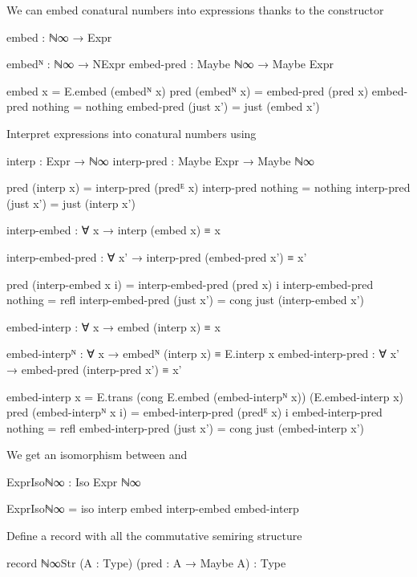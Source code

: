 We can embed conatural numbers into expressions thanks to the
 constructor
\begin{code}
embed : ℕ∞ → Expr
\end{code}
\begin{code}[hide]
embedᴺ : ℕ∞ → NExpr
embed-pred : Maybe ℕ∞ → Maybe Expr

embed x = E.embed (embedᴺ x)
pred (embedᴺ x) = embed-pred (pred x)
embed-pred nothing = nothing
embed-pred (just x') = just (embed x')
\end{code}
Interpret expressions into conatural numbers using 
\begin{code}
interp : Expr → ℕ∞
interp-pred : Maybe Expr → Maybe ℕ∞

pred (interp x) = interp-pred (predᴱ x)
interp-pred nothing = nothing
interp-pred (just x') = just (interp x')
\end{code}
\begin{code}
interp-embed : ∀ x → interp (embed x) ≡ x
\end{code}
\begin{code}[hide]
interp-embed-pred : ∀ x' → interp-pred (embed-pred x') ≡ x'

pred (interp-embed x i) = interp-embed-pred (pred x) i
interp-embed-pred nothing = refl
interp-embed-pred (just x') = cong just (interp-embed x')
\end{code}
\begin{code}
embed-interp : ∀ x → embed (interp x) ≡ x
\end{code}
\begin{code}[hide]
embed-interpᴺ : ∀ x → embedᴺ (interp x) ≡ E.interp x
embed-interp-pred : ∀ x' → embed-pred (interp-pred x') ≡ x'

embed-interp x = E.trans (cong E.embed (embed-interpᴺ x)) (E.embed-interp x)
pred (embed-interpᴺ x i) = embed-interp-pred (predᴱ x) i
embed-interp-pred nothing = refl
embed-interp-pred (just x') = cong just (embed-interp x')
\end{code}
We get an isomorphism between  and 
\begin{code}
ExprIsoℕ∞ : Iso Expr ℕ∞
\end{code}
\begin{code}[hide]
ExprIsoℕ∞ = iso interp embed interp-embed embed-interp
\end{code}
Define a record with all the commutative semiring structure
\begin{code}
record ℕ∞Str (A : Type) (pred : A → Maybe A) : Type
\end{code}
